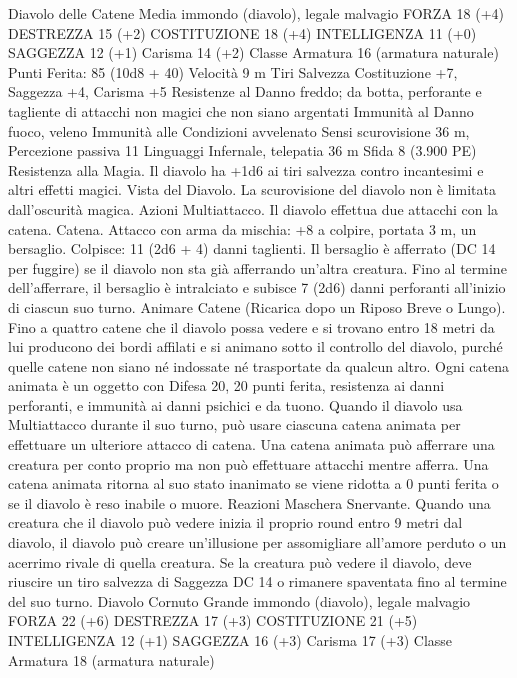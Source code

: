 \begin{multicols}{2}
Diavolo delle Catene
Media immondo (diavolo), legale malvagio
FORZA 18 (+4)
DESTREZZA 15 (+2)
COSTITUZIONE 18 (+4)
INTELLIGENZA 11 (+0)
SAGGEZZA 12 (+1)
Carisma 14 (+2)
Classe Armatura 16 (armatura naturale)
\hspace*{0pt}\hfill{Punti Ferita}: 85 (10d8 + 40)
Velocità 9 m
Tiri Salvezza Costituzione +7, Saggezza +4, Carisma +5
Resistenze al Danno freddo; da botta, perforante e tagliente
di attacchi non magici che non siano argentati
Immunità al Danno fuoco, veleno
Immunità alle Condizioni avvelenato
Sensi scurovisione 36 m, Percezione passiva 11
Linguaggi Infernale, telepatia 36 m
Sfida 8 (3.900 PE)
Resistenza alla Magia. Il diavolo ha +1d6 ai tiri salvezza
contro incantesimi e altri effetti magici.
Vista del Diavolo. La scurovisione del diavolo non è limitata
dall’oscurità magica.
Azioni
Multiattacco. Il diavolo effettua due attacchi con la catena.
Catena. Attacco con arma da mischia: +8 a colpire, portata 3 m,
un bersaglio.
Colpisce: 11 (2d6 + 4) danni taglienti. Il bersaglio è afferrato
(DC 14 per fuggire) se il diavolo non sta già afferrando un’altra
creatura. Fino al termine dell’afferrare, il bersaglio è intralciato e
subisce 7 (2d6) danni perforanti all’inizio di ciascun suo turno.
Animare Catene (Ricarica dopo un Riposo Breve o Lungo).
Fino a quattro catene che il diavolo possa vedere e si trovano
entro 18 metri da lui producono dei bordi affilati e si animano
sotto il controllo del diavolo, purché quelle catene non siano né
indossate né trasportate da qualcun altro.
Ogni catena animata è un oggetto con Difesa 20, 20 punti ferita,
resistenza ai danni perforanti, e immunità ai danni psichici e da
tuono. Quando il diavolo usa Multiattacco durante il suo turno,
può usare ciascuna catena animata per effettuare un ulteriore
attacco di catena. Una catena animata può afferrare una creatura
per conto proprio ma non può effettuare attacchi mentre afferra.
Una catena animata ritorna al suo stato inanimato se viene ridotta
a 0 punti ferita o se il diavolo è reso inabile o muore.
Reazioni
Maschera Snervante. Quando una creatura che il diavolo può
vedere inizia il proprio round entro 9 metri dal diavolo, il diavolo
può creare un’illusione per assomigliare all’amore perduto o un
acerrimo rivale di quella creatura. Se la creatura può vedere il
diavolo, deve riuscire un tiro salvezza di Saggezza DC 14 o
rimanere spaventata fino al termine del suo turno.
Diavolo Cornuto
Grande immondo (diavolo), legale malvagio
FORZA 22 (+6)
DESTREZZA 17 (+3)
COSTITUZIONE 21 (+5)
INTELLIGENZA 12 (+1)
SAGGEZZA 16 (+3)
Carisma 17 (+3)
Classe Armatura 18 (armatura naturale)

\end{multicols}
